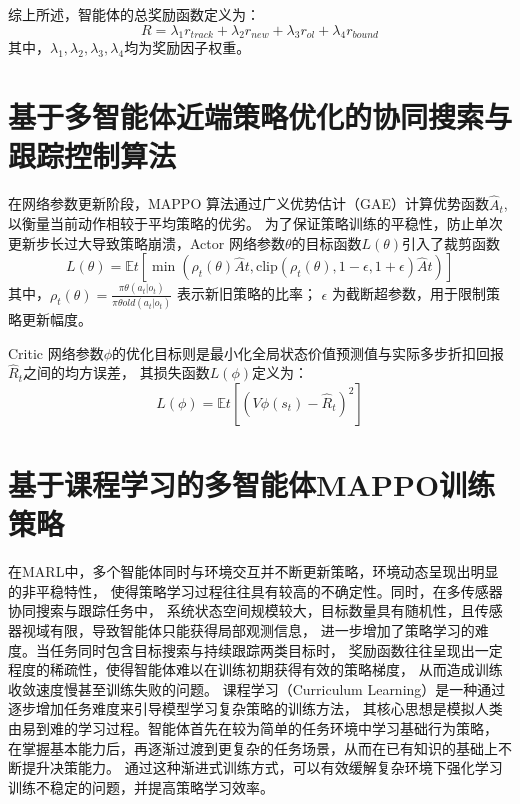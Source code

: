 综上所述，智能体的总奖励函数定义为：
\begin{equation}
R=\lambda_1r_{track}+\lambda_2r_{new}+\lambda_3r_{ol}+\lambda_4r_{bound}
\end{equation}
其中，$\lambda_1,\lambda_2,\lambda_3,\lambda_4$均为奖励因子权重。

\section{基于多智能体近端策略优化的协同搜索与跟踪控制算法}


在网络参数更新阶段，MAPPO 算法通过广义优势估计（GAE）计算优势函数$\hat{A}_t$,以衡量当前动作相较于平均策略的优劣。
为了保证策略训练的平稳性，防止单次更新步长过大导致策略崩溃，Actor 网络参数$\theta$的目标函数$L(\theta)$引入了裁剪函数
\begin{equation}
L(\theta) = \mathbb{E}{t}\left[ \min \left( \rho_t(\theta)\hat{A}t, \text{clip}\left( \rho_t(\theta), 1-\epsilon, 1+\epsilon \right)\hat{A}t \right) \right]
\end{equation}
其中，$\rho_t(\theta) = \frac{\pi\theta(a_t|o_t)}{\pi{\theta{old}}(a_t|o_t)}$ 表示新旧策略的比率；
$\epsilon$ 为截断超参数，用于限制策略更新幅度。

Critic 网络参数$\phi$的优化目标则是最小化全局状态价值预测值与实际多步折扣回报$\hat{R}_t$之间的均方误差，
其损失函数$L(\phi)$定义为：
\begin{equation}
L(\phi) = \mathbb{E}{t}\left[ \left( V\phi(s_t) - \hat{R}_t \right)^2 \right]
\end{equation}

\section{基于课程学习的多智能体MAPPO训练策略}
在MARL中，多个智能体同时与环境交互并不断更新策略，环境动态呈现出明显的非平稳特性，
使得策略学习过程往往具有较高的不确定性。同时，在多传感器协同搜索与跟踪任务中，
系统状态空间规模较大，目标数量具有随机性，且传感器视域有限，导致智能体只能获得局部观测信息，
进一步增加了策略学习的难度。当任务同时包含目标搜索与持续跟踪两类目标时，
奖励函数往往呈现出一定程度的稀疏性，使得智能体难以在训练初期获得有效的策略梯度，
从而造成训练收敛速度慢甚至训练失败的问题。
课程学习（Curriculum Learning）是一种通过逐步增加任务难度来引导模型学习复杂策略的训练方法，
其核心思想是模拟人类由易到难的学习过程。智能体首先在较为简单的任务环境中学习基础行为策略，
在掌握基本能力后，再逐渐过渡到更复杂的任务场景，从而在已有知识的基础上不断提升决策能力。
通过这种渐进式训练方式，可以有效缓解复杂环境下强化学习训练不稳定的问题，并提高策略学习效率。


